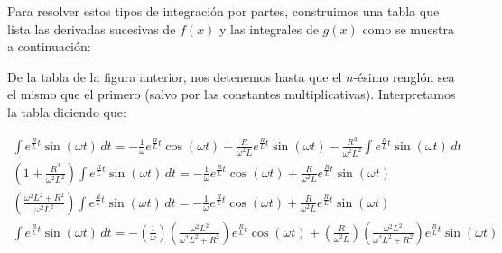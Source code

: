 \documentclass{article}
\begin{document}
\noindent Para resolver estos tipos de integración por partes, construimos una tabla que lista las derivadas sucesivas de $f(x)$ y las integrales de $g(x)$ como se muestra a continuación:

\begin{figure}[H]
	\centering	
{}
	\caption{}	
	\label{fig:figura2}
\end{figure}

\noindent De la tabla de la figura anterior, nos detenemos hasta que el $n$-ésimo renglón sea el mismo que el primero (salvo por las constantes multiplicativas). Interpretamos la tabla diciendo que:

\begin{align}
	\int e^{\frac{R}{L}t}\sin(\omega t) \, dt = -\frac{1}{\omega} e^{\frac{R}{L}t} \cos (\omega t) + \frac{R}{\omega^2 L} e^{\frac{R}{L}t} \sin (\omega t) - \frac{R^2}{\omega^2 L^2} \int e^{\frac{R}{L}t} \sin (\omega t) \, dt \nonumber \\
	\left( 1 + \frac{R^2}{\omega^2 L^2} \right) \int e^{\frac{R}{L}t}\sin(\omega t) \, dt = -\frac{1}{\omega} e^{\frac{R}{L}t} \cos (\omega t) + \frac{R}{\omega^2 L} e^{\frac{R}{L}t} \sin (\omega t) \nonumber \\
	\left( \frac{\omega^2 L^2 + R^2}{\omega^2 L^2} \right) 	\int e^{\frac{R}{L}t}\sin(\omega t) \, dt =-\frac{1}{\omega} e^{\frac{R}{L}t} \cos (\omega t) + \frac{R}{\omega^2 L} e^{\frac{R}{L}t} \sin (\omega t) \nonumber \\
	\int e^{\frac{R}{L}t}\sin(\omega t) \, dt = -\left( \frac{1}{\omega} \right) \left( \frac{\omega^2 L^2}{\omega^2 L^2 + R^2} \right)e^{\frac{R}{L}t} \cos (\omega t) + \left( \frac{R}{\omega^2 L} \right) \left( \frac{\omega^2 L^2}{\omega^2 L^2 + R^2} \right) e^{\frac{R}{L}t} \sin (\omega t) \nonumber
\end{align}
\end{document}
